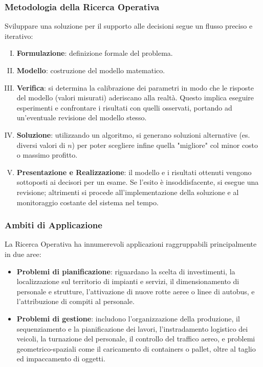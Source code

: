 \documentclass[12pt]{extarticle} %
\begin{document}
\subsubsection{Metodologia della Ricerca Operativa}
Sviluppare una soluzione per il supporto alle decisioni segue un flusso preciso e iterativo:
\begin{enumerate}[I., leftmargin=*]
    \item \textbf{Formulazione}: definizione formale del problema.
    \item \textbf{Modello}: costruzione del modello matematico.
    \item \textbf{Verifica}: si determina la calibrazione dei parametri in modo che le risposte del modello (valori misurati) aderiscano alla realtà. Questo implica eseguire esperimenti e confrontare i risultati con quelli osservati, portando ad un'eventuale revisione del modello stesso.
    \item \textbf{Soluzione}: utilizzando un algoritmo, si generano soluzioni alternative (es. diversi valori di $n$) per poter scegliere infine quella "migliore" col minor costo o massimo profitto.
    \item \textbf{Presentazione e Realizzazione}: il modello e i risultati ottenuti vengono sottoposti ai decisori per un esame. Se l'esito è insoddisfacente, si esegue una revisione; altrimenti si procede all'implementazione della soluzione e al monitoraggio costante del sistema nel tempo.
\end{enumerate}

\subsubsection{Ambiti di Applicazione}
La Ricerca Operativa ha innumerevoli applicazioni raggruppabili principalmente in due aree:
\begin{itemize}
    \item \textbf{Problemi di pianificazione}: riguardano la scelta di investimenti, la localizzazione sul territorio di impianti e servizi, il dimensionamento di personale e strutture, l'attivazione di nuove rotte aeree o linee di autobus, e l'attribuzione di compiti al personale.
    \item \textbf{Problemi di gestione}: includono l'organizzazione della produzione, il sequenziamento e la pianificazione dei lavori, l'instradamento logistico dei veicoli, la turnazione del personale, il controllo del traffico aereo, e problemi geometrico-spaziali come il caricamento di containers o pallet, oltre al taglio ed impaccamento di oggetti.
\end{itemize}
\end{document}
